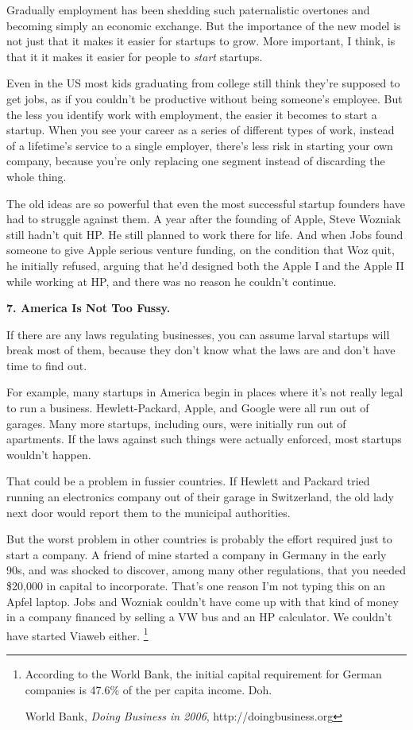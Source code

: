 \documentclass[12pt]{book}
\begin{document}
Gradually employment has been shedding such paternalistic overtones and
becoming simply an economic exchange. But the importance of the new
model is not just that it makes it easier for startups to grow. More
important, I think, is that it it makes it easier for people to
\emph{start} startups.

Even in the US most kids graduating from college still think they're
supposed to get jobs, as if you couldn't be productive without being
someone's employee. But the less you identify work with employment, the
easier it becomes to start a startup. When you see your career as a
series of different types of work, instead of a lifetime's service to a
single employer, there's less risk in starting your own company, because
you're only replacing one segment instead of discarding the whole thing.

The old ideas are so powerful that even the most successful startup
founders have had to struggle against them. A year after the founding of
Apple, Steve Wozniak still hadn't quit HP. He still planned to work
there for life. And when Jobs found someone to give Apple serious
venture funding, on the condition that Woz quit, he initially refused,
arguing that he'd designed both the Apple I and the Apple II while
working at HP, and there was no reason he couldn't continue.

\textbf{7. America Is Not Too Fussy.}

If there are any laws regulating businesses, you can assume larval
startups will break most of them, because they don't know what the laws
are and don't have time to find out.

For example, many startups in America begin in places where it's not
really legal to run a business. Hewlett-Packard, Apple, and Google were
all run out of garages. Many more startups, including ours, were
initially run out of apartments. If the laws against such things were
actually enforced, most startups wouldn't happen.

That could be a problem in fussier countries. If Hewlett and Packard
tried running an electronics company out of their garage in Switzerland,
the old lady next door would report them to the municipal authorities.

But the worst problem in other countries is probably the effort required
just to start a company. A friend of mine started a company in Germany
in the early 90s, and was shocked to discover, among many other
regulations, that you needed \$20,000 in capital to incorporate. That's
one reason I'm not typing this on an Apfel laptop. Jobs and Wozniak
couldn't have come up with that kind of money in a company financed by
selling a VW bus and an HP calculator. We couldn't have started Viaweb
either. \footnote{According to the World Bank, the initial capital requirement for
German companies is 47.6\% of the per capita income. Doh.

World Bank, \emph{Doing Business in 2006}, http://doingbusiness.org}
\end{document}
